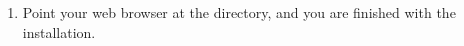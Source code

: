 \begin{enumerate}
\item Point your web browser at the  directory,
and you are finished with the installation.

\end{enumerate}

